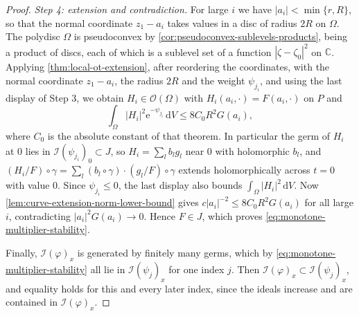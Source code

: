 \begin{proof}
\emph{Step 4: extension and contradiction.} For large $i$ we have $|a_i|<\min\{r,R\}$, so that the normal coordinate $z_1-a_i$ takes values in a disc of radius $2R$ on $\Omega$. The polydisc $\Omega$ is pseudoconvex by \cref{cor:pseudoconvex-sublevels-products}, being a product of discs, each of which is a sublevel set of a function $|\zeta-\zeta_0|^2$ on $\mathbb C$. Applying \cref{thm:local-ot-extension}, after reordering the coordinates, with the normal coordinate $z_1-a_i$, the radius $2R$ and the weight $\psi_{j_i}$, and using the last display of Step 3, we obtain $H_i\in\mathcal O(\Omega)$ with $H_i(a_i,\cdot)=F(a_i,\cdot)$ on $P$ and
\[
 \int_\Omega|H_i|^2\mathrm e^{-\psi_{j_i}}\,\mathrm dV\leq 8C_0R^2G(a_i),
\]
where $C_0$ is the absolute constant of that theorem. In particular the germ of $H_i$ at $0$ lies in $\mathcal I(\psi_{j_i})_0\subset J$, so $H_i=\sum_lb_lg_l$ near $0$ with holomorphic $b_l$, and $(H_i/F)\circ\gamma=\sum_l(b_l\circ\gamma)\cdot(g_l/F)\circ\gamma$ extends holomorphically across $t=0$ with value $0$. Since $\psi_{j_i}\leq0$, the last display also bounds $\int_\Omega|H_i|^2\,\mathrm dV$. Now \cref{lem:curve-extension-norm-lower-bound} gives $c|a_i|^{-2}\leq8C_0R^2G(a_i)$ for all large $i$, contradicting $|a_i|^2G(a_i)\to0$. Hence $F\in J$, which proves \eqref{eq:monotone-multiplier-stability}.

Finally, $\mathcal I(\varphi)_x$ is generated by finitely many germs, which by \eqref{eq:monotone-multiplier-stability} all lie in $\mathcal I(\psi_j)_x$ for one index $j$. Then $\mathcal I(\varphi)_x\subset\mathcal I(\psi_j)_x$, and equality holds for this and every later index, since the ideals increase and are contained in $\mathcal I(\varphi)_x$.
\end{proof}

